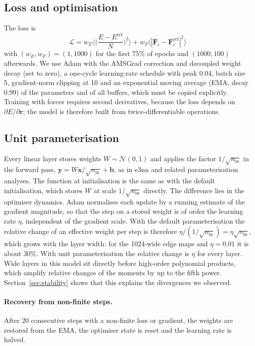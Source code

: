 \documentclass[journal=jctcce,manuscript=article,layout=traditional]{achemso}
\newcommand{\vect}[1]{\bm{#1}}
\begin{document}
\subsection{Loss and optimisation}
The loss is
\begin{equation}
\mathcal L=w_E\Big\langle\Big(\frac{E-E^\text{ref}}{N}\Big)^2\Big\rangle+w_F\big\langle|\vect F_i-\vect F_i^\text{ref}|^2\big\rangle
\end{equation}
with $(w_E,w_F)=(1,1000)$ for the first 75\% of epochs and $(1000,100)$ afterwards. We use Adam\cite{kingma2015adam}
with the AMSGrad correction\cite{reddi2018amsgrad} and decoupled weight decay (set to zero)\cite{loshchilov2019adamw},
a one-cycle learning-rate schedule\cite{smith2017onecycle} with peak 0.04, batch size 5, gradient-norm clipping at
10 and an exponential moving average (EMA, decay 0.99) of the parameters and of all buffers, which must be copied
explicitly. Training with forces requires second derivatives, because the loss depends on
$\partial E/\partial\vect r$; the model is therefore built from twice-differentiable operations.

\subsection{Unit parameterisation}
Every linear layer stores weights $W\sim\mathcal N(0,1)$ and applies the factor
$1/\sqrt{n_\text{in}}$ in the forward pass, $\vect y=W\vect x/\sqrt{n_\text{in}}+\vect b$, as in
e3nn\cite{geiger2022e3nn} and related parameterisation analyses\cite{yang2022mup}. The function at initialisation is
the same as with the default initialisation, which stores $W$ at scale $1/\sqrt{n_\text{in}}$ directly. The
difference lies in the optimiser dynamics. Adam normalises each update by a running estimate of the gradient
magnitude, so that the step on a stored weight is of order the learning rate $\eta$, independent of the gradient
scale. With the default parameterisation the relative change of an effective weight per step is therefore
$\eta/(1/\sqrt{n_\text{in}})=\eta\sqrt{n_\text{in}}$, which grows with the layer width: for the 1024-wide edge maps
and $\eta=0.01$ it is about 30\%. With unit parameterisation the relative change is $\eta$ for every layer. Wide
layers in this model sit directly before high-order polynomial products, which amplify relative changes of the
moments by up to the fifth power. Section~\ref{sec:stability} shows that this explains the divergences we observed.

\paragraph{Recovery from non-finite steps.} After 20 consecutive steps with a non-finite loss or gradient, the weights are restored from
the EMA, the optimiser state is reset and the learning rate is halved.
\end{document}
